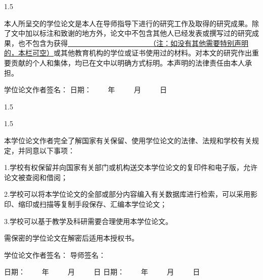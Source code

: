\begin{titlepage}

\par\vskip30pt
\begin{spacing}{1.5}
\end{spacing}

\par\vskip20pt
本人所呈交的学位论文是本人在导师指导下进行的研究工作及取得的研究成果。除了文中加以标注和致谢的地方外，论文中不包含其他人已经发表或撰写过的研究成果，也不包含为获得\underline{~~~~~~~~~~~~~~~~~~~~~~~（注：如没有其他需要特别声明的，本栏可空）}或其他教育机构的学位或证书使用过的材料。对本文的研究作出重要贡献的个人和集体，均已在文中以明确方式标明。本声明的法律责任由本人承担。

\par\vskip60pt

学位论文作者签名：\hspace*{160pt} 日期：~~~~ 年 ~~~~ 月 ~~~~ 日

\begin{spacing}{1.5}
\centering{ - - - - - - - - - - - - - - - - - - - - - - - - - - - - - - - - - - - - - - - - - - - - - - - - - - - - - - - - - - - - - - - - - - }
\end{spacing}


\begin{spacing}{1.5}
\end{spacing}

\par\vskip20pt
本学位论文作者完全了解国家有关保留、使用学位论文的法律、法规和学校有关规定，并同意以下事项：

1.学校有权保留并向国家有关部门或机构送交本学位论文的复印件和电子版，允许论文被查阅和借阅；

2.学校可以将本学位论文的全部或部分内容编入有关数据库进行检索，可以采用影印、缩印或扫描等复制手段保存、汇编本学位论文；

3.学校可以基于教学及科研需要合理使用本学位论文。

需保密的学位论文在解密后适用本授权书。

\par\vskip60pt
学位论文作者签名：\hspace*{160pt} 导师签名：
\par\vskip20pt
日期：~~~~ 年 ~~~~ 月 ~~~~ 日 \hspace*{135pt} 日期：~~~~ 年 ~~~~ 月 ~~~~ 日

\end{titlepage}
